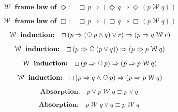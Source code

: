 \documentclass[12pt, fleqn, leqno]{article}
\newcommand{\impl}{\ensuremath{\Rightarrow}}        %
\newcommand{\Wait}{\;\mathcal{W}\;}
\newcommand{\Next}{\;\,\text{\raisebox{3.5pt}{\circle{6}}}}
\newcommand{\Event}{\Diamond\,}
\newcommand{\Always}{\Box\,}
\newcommand{\spacer}{\vspace{-30pt}}
\begin{document}
\spacer

\begin{equation}\label{E:waitframelawEvent}
\textbf{$\Wait$ frame law of $\Event$:}\quad \Always p \impl (\Event q \impl \Event (p \Wait q))
\end{equation}

\spacer

\begin{equation}\label{E:waitframelawAlways}
\textbf{$\Wait$ frame law of $\Always$:}\quad \Always p \impl (\Always q \impl \Always (p \Wait q))
\end{equation}

\spacer

\begin{equation}\label{E:waitInduct4}
\textbf{$\Wait$ induction:}\quad \Always (p \impl (\Next p\land q)\lor r) \impl (p \impl q\Wait r)
\end{equation}

\spacer

\begin{equation}\label{E:waitInduct3}
\textbf{$\Wait$ induction:}\quad \Always (p \impl \Next (p\lor q)) \impl  (p \impl p \Wait q)
\end{equation}

\spacer

\begin{equation}\label{E:waitInduct1}
\textbf{$\Wait$ induction:}\quad \Always (p \impl \Next p) \impl  (p \impl p \Wait q)
\end{equation}

\spacer

\begin{equation}\label{E:waitInduct2}
\textbf{$\Wait$ induction:}\quad \Always (p \impl q \land \Next p) \impl  (p \impl p \Wait q)
\end{equation}

\spacer

\begin{equation}\label{E:waitOrP}
\textbf{Absorption:}\quad p\lor p\Wait q\equiv p\lor q
\end{equation}

\spacer

\begin{equation}\label{E:waitOrQ}
\textbf{Absorption:}\quad p\Wait q\lor q\equiv p\Wait q
\end{equation}
\end{document}
